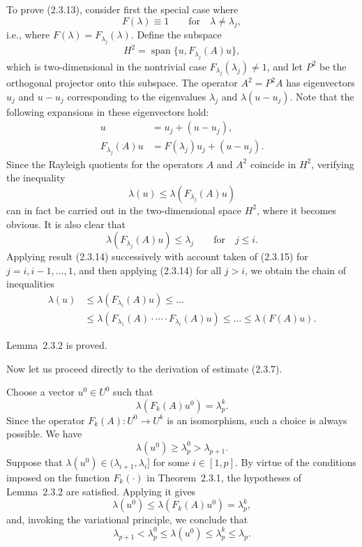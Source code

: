 \documentclass[11pt,oneside]{book}
\newcommand{\myspan}{\operatorname{span}}
\begin{document}
To prove (2.3.13), consider first the special case where
\[
F(\lambda) \equiv 1 \qquad \text{for} \quad \lambda \neq \lambda_j,
\]
i.e., where $F(\lambda) = F_{\lambda_j}(\lambda)$. Define the subspace
\[
H^2 = \myspan\{u, F_{\lambda_j}(A)u\},
\]
which is two-dimensional in the nontrivial case $F_{\lambda_j}(\lambda_j) \neq 1$, and let $P^2$ be the orthogonal projector onto this subspace. The operator $A^2 = P^2 A$ has eigenvectors $u_j$ and $u - u_j$ corresponding to the eigenvalues $\lambda_j$ and $\lambda(u - u_j)$. Note that the following expansions in these eigenvectors hold:
\[
\begin{aligned}
u &= u_j + (u - u_j), \\
F_{\lambda_j}(A)u &= F(\lambda_j)u_j + (u - u_j).
\end{aligned}
\]
Since the Rayleigh quotients for the operators $A$ and $A^2$ coincide in $H^2$, verifying the inequality
\[
\lambda(u) \leqslant \lambda(F_{\lambda_j}(A)u) \tag{2.3.14}
\]
can in fact be carried out in the two-dimensional space $H^2$, where it becomes obvious. It is also clear that
\[
\lambda(F_{\lambda_j}(A)u) \leqslant \lambda_j \qquad \text{for} \quad j \leqslant i. \tag{2.3.15}
\]
Applying result (2.3.14) successively with account taken of (2.3.15) for $j = i, i - 1, \ldots, 1$, and then applying (2.3.14) for all $j > i$, we obtain the chain of inequalities
\[
\begin{aligned}
\lambda(u) &\leqslant \lambda(F_{\lambda_i}(A)u) \leqslant \ldots \\
&\leqslant \lambda(F_{\lambda_1}(A) \cdot \cdots \cdot F_{\lambda_i}(A)u) \leqslant \ldots \leqslant \lambda(F(A)u).
\end{aligned}
\]

Lemma~2.3.2 is proved.

Now let us proceed directly to the derivation of estimate (2.3.7).

Choose a vector $u^0 \in U^0$ such that
\[
\lambda(F_k(A)u^0) = \lambda_p^k.
\]
Since the operator $F_k(A) : U^0 \to U^k$ is an isomorphism, such a choice is always possible. We have
\[
\lambda(u^0) \geqslant \lambda_p^0 > \lambda_{p+1}.
\]
Suppose that $\lambda(u^0) \in (\lambda_{i+1}, \lambda_i]$ for some $i \in [1, p]$. By virtue of the conditions imposed on the function $F_k(\cdot)$ in Theorem~2.3.1, the hypotheses of Lemma~2.3.2 are satisfied. Applying it gives
\[
\lambda(u^0) \leqslant \lambda(F_k(A)u^0) = \lambda_p^k,
\]
and, invoking the variational principle, we conclude that
\[
\lambda_{p+1} < \lambda_p^0 \leqslant \lambda(u^0) \leqslant \lambda_p^k \leqslant \lambda_p. \tag{2.3.16}
\]
\end{document}
